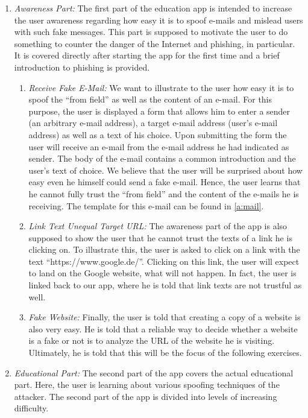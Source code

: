 \begin{enumerate}
	\item \textit{Awareness Part:} The first part of the education app is intended to increase the user awareness regarding how easy it is to spoof e-mails and mislead users with such fake messages.
 This part is supposed to motivate the user to do something to counter the danger of the Internet and phishing, in particular.
It is covered directly after starting the app for the first time and a brief introduction to phishing is provided.
\begin{enumerate}
		\item \textit{Receive Fake E-Mail:} We want to illustrate to the user how easy it is to spoof the ``from field'' as well as the content of an e-mail.
 For this purpose, the user is displayed a form that allows him to enter a sender (an arbitrary e-mail address), a target e-mail address (user's e-mail address) as well as a text of his choice.
 Upon submitting the form the user will receive an e-mail from the e-mail address he had indicated as sender.
The body of the e-mail contains a common introduction and the user's text of choice.
 We believe that the user will be surprised about how easy even he himself could send a fake e-mail.
Hence, the user learns that he cannot fully trust the ``from field'' and the content of the e-mails he is receiving.
The template for this e-mail can be found in \autoref{a:mail}.
		\item \textit{Link Text Unequal Target URL:} The awareness part of the app is also supposed to show the user that he cannot trust the texts of a link he is clicking on.
 To illustrate this, the user is asked to click on a link with the text ``https://www.google.de/''. Clicking on this link, the user will expect to land on the Google website, what will not happen.
 In fact, the user is linked back to our app, where he is told that link texts are not trustful as well.
 
	\item \textit{Fake Website:} Finally, the user is told that creating a copy of a website is also very easy.
 He is told that a reliable way to decide whether a website is a fake or not is to analyze the URL of the website he is visiting.
Ultimately, he is told that this will be the focus of the following exercises.

\end{enumerate}
	\item \textit{Educational Part:} The second part of the app covers the actual educational part.
 Here, the user is learning about various spoofing techniques of the attacker. The second part of the app is divided into levels of increasing difficulty.


\end{enumerate}

